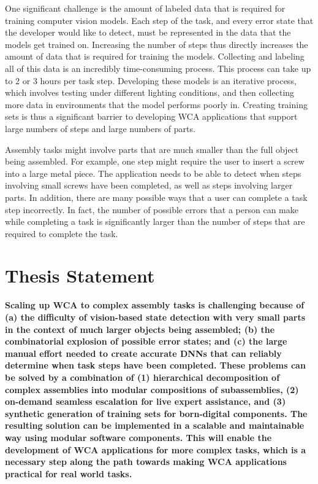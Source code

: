 One significant challenge is the amount of labeled data that is required for
training computer vision models. Each
step of the task, and every error state that the developer would like to detect,
must be represented in the data that the models get trained on.
Increasing the number of steps thus directly increases the amount of data that
is required for training the models.
Collecting and labeling all of this data is an incredibly time-consuming
process.
This process can take up to 2 or 3 hours per task step.
Developing these models is an iterative process, which involves testing under
different lighting conditions, and then collecting more data in environments
that the model performs poorly in.
Creating training sets is thus a significant barrier to developing WCA
applications that support large numbers of steps and large numbers of parts.

Assembly tasks might involve parts that are much smaller than the full object
being assembled.
For example, one step might require the user to insert a screw into a large
metal piece.
The application needs to be able to detect when steps involving small screws
have been completed, as well as steps involving larger parts.
In addition, there are many possible ways that a user can complete a task step
incorrectly.
In fact, the number of possible errors that a person can make while completing a
task is significantly larger than the number of steps that are required to
complete the task.

\section{Thesis Statement}

\textbf{
  Scaling up WCA to complex assembly tasks is challenging because of
  (a) the difficulty of
  vision-based state detection with very small parts in the context of much
  larger objects being assembled; (b) the combinatorial explosion
  of possible error states; and (c) the large manual effort needed to create
  accurate DNNs that can reliably determine when task steps have been completed.
  These problems can be solved by a combination of (1) hierarchical
  decomposition of
  complex assemblies into modular compositions of subassemblies, (2) on-demand
  seamless
  escalation for live expert assistance, and (3) synthetic generation of
  training
  sets for born-digital components. The resulting solution can be implemented in
  a scalable and maintainable way using modular software components.
  This will enable the development of WCA applications for more complex tasks,
  which is a necessary step along the path towards making WCA applications
  practical for real world tasks.
}

